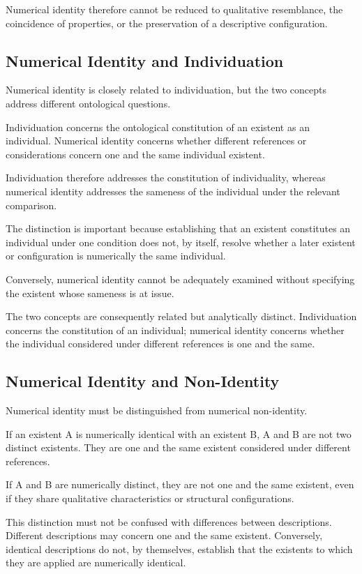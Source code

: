 Numerical identity therefore cannot be reduced to
qualitative resemblance, the coincidence of properties,
or the preservation of a descriptive configuration.

\subsection{Numerical Identity and Individuation}

Numerical identity is closely related to individuation,
but the two concepts address different ontological
questions.

Individuation concerns the ontological constitution
of an existent as an individual. Numerical identity
concerns whether different references or considerations
concern one and the same individual existent.

Individuation therefore addresses the constitution
of individuality, whereas numerical identity addresses
the sameness of the individual under the relevant
comparison.

The distinction is important because establishing
that an existent constitutes an individual under
one condition does not, by itself, resolve whether
a later existent or configuration is numerically
the same individual.

Conversely, numerical identity cannot be adequately
examined without specifying the existent whose
sameness is at issue.

The two concepts are consequently related but
analytically distinct. Individuation concerns
the constitution of an individual; numerical
identity concerns whether the individual considered
under different references is one and the same.

\subsection{Numerical Identity and Non-Identity}

Numerical identity must be distinguished from
numerical non-identity.

If an existent A is numerically identical with
an existent B, A and B are not two distinct
existents. They are one and the same existent
considered under different references.

If A and B are numerically distinct, they are
not one and the same existent, even if they
share qualitative characteristics or structural
configurations.

This distinction must not be confused with
differences between descriptions. Different
descriptions may concern one and the same
existent. Conversely, identical descriptions
do not, by themselves, establish that the
existents to which they are applied are
numerically identical.

